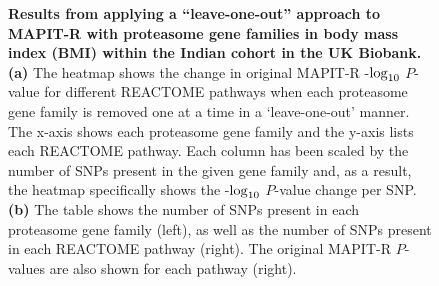 \documentclass[10pt]{article}
\def\log{{\rm log}}
\begin{document}
\begin{figure}[H]
{\begin{tabular}{|cc|ccc|}
  \hline
\end{tabular}}
\caption{\textbf{Results from applying a ``leave-one-out'' approach to MAPIT-R with proteasome gene families in body mass index (BMI) within the Indian cohort in the UK Biobank.} \textbf{(a)} The heatmap shows the change in original MAPIT-R -$\log_{10}$ $P$-value for different REACTOME pathways when each proteasome gene family is removed one at a time in a `leave-one-out' manner. The x-axis shows each proteasome gene family and the y-axis lists each REACTOME pathway. Each column has been scaled by the number of SNPs present in the given gene family and, as a result, the heatmap specifically shows the -$\log_{10}$ $P$-value change per SNP. \textbf{(b)} The table shows the number of SNPs present in each proteasome gene family (left), as well as the number of SNPs present in each REACTOME pathway (right). The original MAPIT-R $P$-values are also shown for each pathway (right).}
\label{InterPath-Supp-Figure-Prot-Heatplots-Indian}
\end{figure}
\clearpage
\end{document}
